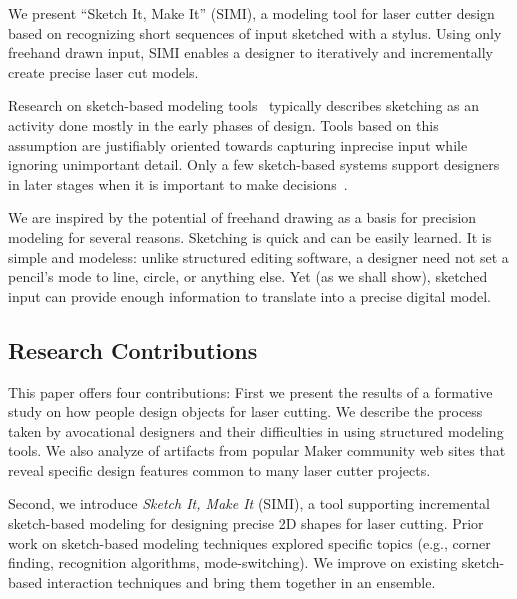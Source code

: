 \documentclass{article}
\begin{document}
We present ``Sketch It, Make It'' (SIMI), a modeling tool for laser
cutter design based on recognizing short sequences of input sketched
with a stylus. Using only freehand drawn input, SIMI enables a
designer to iteratively and incrementally create precise laser cut
models.

Research on sketch-based modeling tools~\cite{johnson-sketch-review}
typically describes sketching as an activity done mostly in the early
phases of design. Tools based on this assumption are justifiably
oriented towards capturing inprecise input while ignoring unimportant
detail. Only a few sketch-based systems support designers in later
stages when it is important to make
decisions~\cite{mori-plushie,saul-sketch-chair,naya-parsketch}.


We are inspired by the potential of freehand drawing as a basis for
precision modeling for several reasons. Sketching is quick and can be
easily learned. It is simple and modeless: unlike structured editing
software, a designer need not set a pencil's mode to line, circle, or
anything else. Yet (as we shall show), sketched input can provide
enough information to translate into a precise digital model.

\subsection{Research Contributions}

This paper offers four contributions: First we present the results of
a formative study on how people design objects for laser cutting. We
describe the process taken by avocational designers and their
difficulties in using structured modeling tools. We also analyze of
artifacts from popular Maker community web sites that reveal specific
design features common to many laser cutter projects.

Second, we introduce \textit{Sketch It, Make It} (SIMI), a tool
supporting incremental sketch-based modeling for designing precise 2D
shapes for laser cutting. Prior work on sketch-based modeling
techniques explored specific topics (e.g., corner finding, recognition
algorithms, mode-switching). We improve on existing sketch-based
interaction techniques and bring them together in an ensemble.
\end{document}
